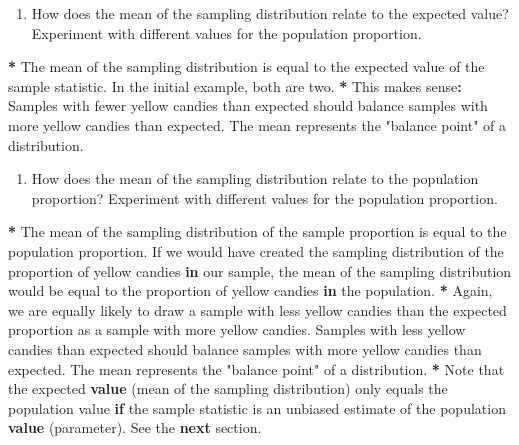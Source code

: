 \documentclass[a4paper]{book}
\newenvironment{Shaded}{\begin{snugshade}}{\end{snugshade}}
\newcommand{\KeywordTok}[1]{\textcolor[rgb]{0,0,0}{\textbf{#1}}}
\newcommand{\StringTok}[1]{\textcolor[rgb]{0.00,0.00,0.00}{#1}}
\newcommand{\ControlFlowTok}[1]{\textcolor[rgb]{0.00,0.00,0.00}{\textbf{#1}}}
\newcommand{\OperatorTok}[1]{\textcolor[rgb]{0.00,0.00,0.00}{\textbf{#1}}}
\newcommand{\NormalTok}[1]{#1}
\providecommand{\tightlist}{%
  \setlength{\itemsep}{0pt}\setlength{\parskip}{0pt}}
\theoremstyle{definition}
\theoremstyle{definition}
\theoremstyle{definition}
\theoremstyle{remark}
\begin{document}
\begin{enumerate}
\def\labelenumi{\arabic{enumi}.}
\setcounter{enumi}{1}
\tightlist
\item
  How does the mean of the sampling distribution relate to the expected
  value? Experiment with different values for the population proportion.
\end{enumerate}

\begin{Shaded}
\begin{Highlighting}[]
\OperatorTok{*}\StringTok{ }\NormalTok{The mean of the sampling distribution is equal to the expected value of the}
\NormalTok{sample statistic. In the initial example, both are two.}
\OperatorTok{*}\StringTok{ }\NormalTok{This makes sense}\OperatorTok{:}\StringTok{ }\NormalTok{Samples with fewer yellow candies than expected should}
\NormalTok{balance samples with more yellow candies than expected. The mean represents the}
\StringTok{"balance point"}\NormalTok{ of a distribution.}
\end{Highlighting}
\end{Shaded}

\begin{enumerate}
\def\labelenumi{\arabic{enumi}.}
\setcounter{enumi}{2}
\tightlist
\item
  How does the mean of the sampling distribution relate to the
  population proportion? Experiment with different values for the
  population proportion.
\end{enumerate}

\begin{Shaded}
\begin{Highlighting}[]
\OperatorTok{*}\StringTok{ }\NormalTok{The mean of the sampling distribution of the sample proportion is equal to}
\NormalTok{the population proportion. If we would have created the sampling distribution}
\NormalTok{of the proportion of yellow candies }\ControlFlowTok{in}\NormalTok{ our sample, the mean of the sampling}
\NormalTok{distribution would be equal to the proportion of yellow candies }\ControlFlowTok{in}\NormalTok{ the}
\NormalTok{population.}
\OperatorTok{*}\StringTok{ }\NormalTok{Again, we are equally likely to draw a sample with less yellow candies than}
\NormalTok{the expected proportion as a sample with more yellow candies. Samples with}
\NormalTok{less yellow candies than expected should balance samples with more yellow}
\NormalTok{candies than expected. The mean represents the }\StringTok{"balance point"}\NormalTok{ of a}
\NormalTok{distribution.}
\OperatorTok{*}\StringTok{ }\NormalTok{Note that the expected }\KeywordTok{value}\NormalTok{ (mean of the sampling distribution) only equals}
\NormalTok{the population value }\ControlFlowTok{if}\NormalTok{ the sample statistic is an unbiased estimate of the}
\NormalTok{population }\KeywordTok{value}\NormalTok{ (parameter). See the }\ControlFlowTok{next}\NormalTok{ section.}
\end{Highlighting}
\end{Shaded}
\end{document}
